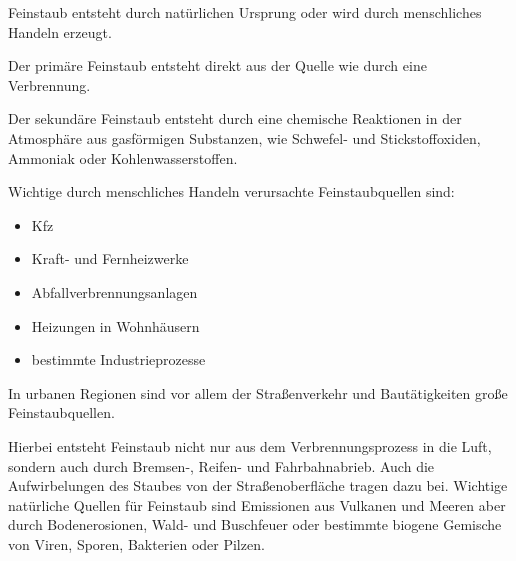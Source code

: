 Feinstaub entsteht durch natürlichen Ursprung oder wird durch menschliches Handeln erzeugt.


Der primäre Feinstaub entsteht direkt aus der Quelle wie durch eine Verbrennung.  

Der sekundäre Feinstaub entsteht durch eine chemische Reaktionen in der Atmosphäre aus gasförmigen Substanzen, 
wie Schwefel- und Stickstoffoxiden, Ammoniak oder Kohlenwasserstoffen.

Wichtige durch menschliches Handeln verursachte Feinstaubquellen sind: 
\begin{itemize}
	\item \ac{Kfz}
	\item Kraft- und Fernheizwerke
	\item Abfallverbrennungsanlagen
	\item Heizungen in Wohnhäusern
	\item bestimmte Industrieprozesse
\end{itemize}

In urbanen Regionen sind vor allem der Straßenverkehr und Bautätigkeiten große Feinstaubquellen.

Hierbei entsteht Feinstaub nicht nur aus dem Verbrennungsprozess in die Luft, sondern auch durch Bremsen-, Reifen- und Fahrbahnabrieb. 
Auch die Aufwirbelungen des Staubes von der Straßenoberfläche tragen dazu bei. 
Wichtige natürliche Quellen für Feinstaub sind Emissionen aus Vulkanen und Meeren aber durch Bodenerosionen, Wald- und Buschfeuer oder 
bestimmte biogene Gemische von Viren, Sporen, Bakterien oder Pilzen.

